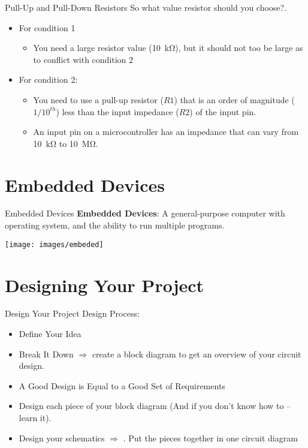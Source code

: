 \documentclass{beamer}
\begin{document}
\begin{darkframes}
\begin{frame}[<+->]{Pull-Up and Pull-Down Resistors}
	So what value resistor should you choose?. 
	\begin{itemize}	
		\item For condition 1
		\begin{itemize}
			\item You need a large resistor value  (\SI{10}{\kilo\ohm}), but it should not too be large as to conflict with condition 2
		\end{itemize}
		\item For condition 2:
		\begin{itemize}
			\item You need to use a pull-up resistor ($R1$) that is an order of magnitude ($1/10^{th}$) less than the input impedance ($R2$) of the input pin.
			\item An input pin on a microcontroller has an impedance that can vary from \SI{10}{\kilo\ohm} to \SI{10}{\mega\ohm}.
		\end{itemize}
	\end{itemize}
\end{frame} 

\section{Embedded Devices}
\begin{frame}[<+->]{Embedded Devices}
	\textbf{Embedded Devices}: A general-purpose computer with  operating system, and the ability to run multiple programs.
	
	\begin{center}
		\texttt{[image: images/embeded]} 
	\end{center}
\end{frame}	

\section{Designing Your Project}


\begin{frame}[<+->]{Design Your Project}
	Design Process:
	
	\begin{itemize}
		\item Define Your Idea 
		\item Break It Down $\Rightarrow$ create a block diagram to get an overview of your circuit design.
		\item A Good Design is Equal to a Good Set of Requirements
		\item Design each piece of your block diagram (And if you don’t know how to – learn it).
		\item Design your schematics $\Rightarrow$ . Put the pieces together in one circuit diagram
		

\end{itemize}
\end{frame}
\end{darkframes}
\end{document}
